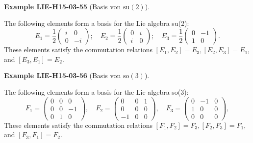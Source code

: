 \documentclass[10pt, letterpaper]{article}
\newcommand{\CustomHeading}[3]{%
  \par\medskip\noindent%
  \textbf{#1 #2} \textnormal{(#3)}.\enskip%
}
\newenvironment{EXA}[2]{\CustomHeading{Example}{#1}{#2}}{}
\begin{document}
\begin{EXA}{LIE-H15-03-55}{Basis von $\mathrm{su}(2)$}
The following elements form a basis for the Lie algebra su(2):
$$
E_{1}=\frac{1}{2}\left(\begin{array}{rr}
i & 0 \\
0 & -i
\end{array}\right) ; \quad E_{2}=\frac{1}{2}\left(\begin{array}{ll}
0 & i \\
i & 0
\end{array}\right) ; \quad E_{3}=\frac{1}{2}\left(\begin{array}{rr}
0 & -1 \\
1 & 0
\end{array}\right) .
$$
These elements satisfy the commutation relations $\left[E_{1}, E_{2}\right]=E_{3},\left[E_{2}, E_{3}\right]=E_{1}$, and $\left[E_{3}, E_{1}\right]=E_{2}$.
\end{EXA}

\begin{EXA}{LIE-H15-03-56}{Basis von $\mathrm{so}(3)$}
The following elements form a basis for the Lie algebra so(3):
$$
F_{1}=\left(\begin{array}{rrr}
0 & 0 & 0 \\
0 & 0 & -1 \\
0 & 1 & 0
\end{array}\right), \quad F_{2}=\left(\begin{array}{rrr}
0 & 0 & 1 \\
0 & 0 & 0 \\
-1 & 0 & 0
\end{array}\right), \quad F_{3}=\left(\begin{array}{rrr}
0 & -1 & 0 \\
1 & 0 & 0 \\
0 & 0 & 0
\end{array}\right),
$$
These elements satisfy the commutation relations $\left[F_{1}, F_{2}\right]=F_{3},\left[F_{2}, F_{3}\right]=F_{1}$, and $\left[F_{3}, F_{1}\right]=F_{2}$.
\end{EXA}
\end{document}
